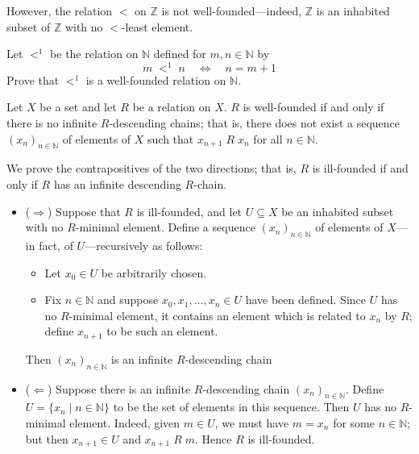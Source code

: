 \begin{example}
\label{exZNotWellFounded}
However, the relation $<$ on $\mathbb{Z}$ is not well-founded---indeed, $\mathbb{Z}$ is an inhabited subset of $\mathbb{Z}$ with no $<$-least element.
\end{example}

\begin{exercise}
\label{exNIsWellFoundedBySuccessor}
Let ${<}^1$ be the relation on $\mathbb{N}$ defined for $m,n \in \mathbb{N}$ by
\[ m \;{<}^1\; n \quad \Leftrightarrow \quad n = m + 1 \]
Prove that ${<}^1$ is a well-founded relation on $\mathbb{N}$.
\end{exercise}

\begin{proposition}
\label{propWellFoundedIffNoInfiniteDescendingChains}
Let $X$ be a set and let $R$ be a relation on $X$. $R$ is well-founded if and only if there is no infinite $R$-descending chains; that is, there does not exist a sequence $(x_n)_{n \in \mathbb{N}}$ of elements of $X$ such that $x_{n+1}\;R\;x_n$ for all $n \in \mathbb{N}$.
\end{proposition}
\begin{cproof}
We prove the contrapositives of the two directions; that is, $R$ is ill-founded if and only if $R$ has an infinite descending $R$-chain.

\begin{itemize}
\item ($\Rightarrow$) Suppose that $R$ is ill-founded, and let $U \subseteq X$ be an inhabited subset with no $R$-minimal element. Define a sequence $(x_n)_{n \in \mathbb{N}}$ of elements of $X$---in fact, of $U$---recursively as follows:
\begin{itemize}
\item Let $x_0 \in U$ be arbitrarily chosen.
\item Fix $n \in \mathbb{N}$ and suppose $x_0, x_1, \dots, x_n \in U$ have been defined. Since $U$ has no $R$-minimal element, it contains an element which is related to $x_n$ by $R$; define $x_{n+1}$ to be such an element.
\end{itemize}
Then $(x_n)_{n \in \mathbb{N}}$ is an infinite $R$-descending chain
\item ($\Leftarrow$) Suppose there is an infinite $R$-descending chain $(x_n)_{n \in \mathbb{N}}$. Define $U = \{ x_n \mid n \in \mathbb{N} \}$ to be the set of elements in this sequence. Then $U$ has no $R$-minimal element. Indeed, given $m \in U$, we must have $m=x_n$ for some $n \in \mathbb{N}$; but then $x_{n+1} \in U$ and $x_{n+1}\;R\;m$. Hence $R$ is ill-founded.
\end{itemize}
\end{cproof}

